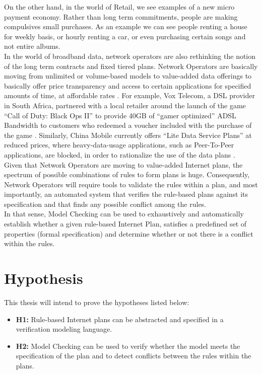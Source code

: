 On the other hand, in the world of Retail, we see examples of a new micro payment economy. Rather than long term commitments, people are making compulsives small purchases. As an example we can see people renting a house for weekly basis, or hourly renting a car, or even purchasing certain songs and not entire albums. \\

In the world of broadband data, network operators are also rethinking the notion of  the long term contracts and fixed tiered plans. Network Operators are basically moving from unlimited or volume-based models to value-added data offerings to basically offer price transparency and access to certain applications for specified amounts of time, at affordable rates \cite{Kimbler2012}. For example, Vox Telecom, a DSL provider in South Africa, partnered with a local retailer around the launch of the game ``Call of Duty: Black Ops II'' to provide 40GB of ``gamer optimized'' ADSL Bandwidth to customers who redeemed a voucher included with the purchase of the game \cite{Sandvine2014}. Similarly, China Mobile currently offers ``Lite Data Service Plans'' at reduced prices, where heavy-data-usage applications, such as Peer-To-Peer applications, are blocked, in order to rationalize the use of the data plans \cite{ChinaMobile2015}. \\

Given that Network Operators are moving to value-added Internet plans, the spectrum of possible combinations of rules to form plans is huge. Consequently, Network Operators will require tools to validate the rules within a plan, and most importantly, an automated system that verifies the rule-based plans against its specification and that finds any possible conflict among the rules. \\

In that sense, Model Checking can be used to exhaustively and automatically establish whether a given rule-based Internet Plan, satisfies a predefined set of properties (formal specification) and determine whether or not there is a conflict within the rules. \\

\section{Hypothesis}
\noindent
This thesis will intend to prove the hypotheses listed below:
\begin{itemize}
\item \textbf{H1:} Rule-based Internet plans can be abstracted and specified in  a verification modeling language. 

\item \textbf{H2:} Model Checking can be used to verify whether the model meets the specification of the plan and to detect conflicts between the rules within the plans. 
\end{itemize}

